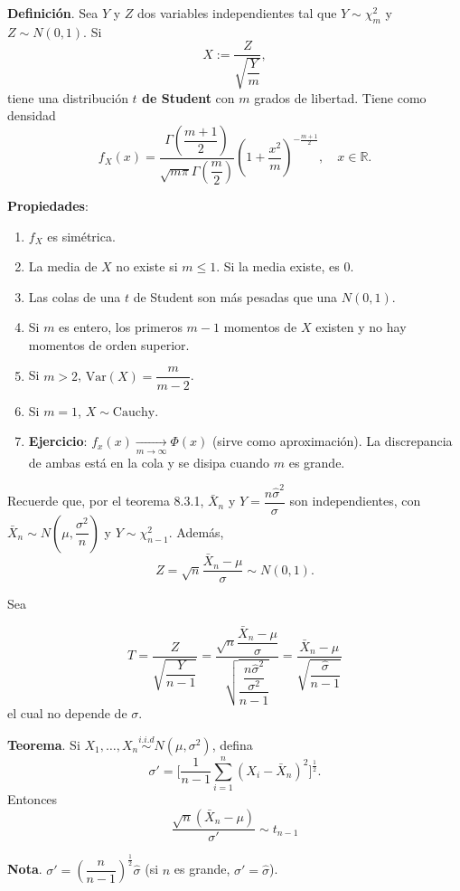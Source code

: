 \documentclass[
  12pt,
]{book}
\begin{document}
\textbf{Definición}. Sea \(Y\) y \(Z\) dos variables independientes tal que \(Y\sim \chi^2_m\) y \(Z\sim N(0,1)\). Si
\[X := \dfrac Z{\sqrt{\dfrac Ym}},\]
tiene una distribución \textbf{\(t\) de Student} con \(m\) grados de libertad. Tiene como densidad
\[f_X(x) = \dfrac{\Gamma\left(\dfrac{m+1}2\right)}{\sqrt{m\pi}\Gamma\left(\dfrac m2 \right)}\left(1+\dfrac{x^2}m\right)^{-\frac{m+1}2}, \quad x\in \mathbb R.\]

\textbf{Propiedades}:

\begin{enumerate}
\def\labelenumi{\arabic{enumi}.}
\item
  \(f_X\) es simétrica.
\item
  La media de \(X\) no existe si \(m\leq 1\). Si la media existe, es 0.
\item
  Las colas de una \(t\) de Student son más pesadas que una \(N(0,1)\).
\item
  Si \(m\) es entero, los primeros \(m-1\) momentos de \(X\) existen y no hay momentos de orden superior.
\item
  Si \(m>2\), \(\text{Var}\left(X \right)=\dfrac m{m-2}\).
\item
  Si \(m=1\), \(X\sim \text{Cauchy}\).
\item
  \textbf{Ejercicio}: \(f_x(x)\xrightarrow[m\to \infty]{}\Phi(x)\) (sirve como aproximación). La discrepancia de ambas está en la cola y se disipa cuando \(m\) es grande.
\end{enumerate}

Recuerde que, por el teorema 8.3.1, \(\bar X_n\) y \(Y=\dfrac{n\hat\sigma^2}{\sigma}\) son independientes, con \(\bar X_n \sim N\left(\mu, \dfrac{\sigma^2}{n}\right)\) y \(Y\sim \chi^2_{n-1}\). Además,
\[Z = \sqrt n\dfrac{\bar X_n-\mu}{\sigma} \sim N(0,1).\]

Sea

\[T = \dfrac Z{\sqrt{\dfrac Y{n-1}}} = \dfrac{\sqrt n \dfrac{\bar X_n-\mu}{\sigma}} {\sqrt{\dfrac{\dfrac{n\hat\sigma^2}{\sigma^2}}{n-1}}} = \dfrac{\bar X_n-\mu}{\sqrt{\dfrac{\hat\sigma}{n-1}}}\]
el cual no depende de \(\sigma\).

\textbf{Teorema}. Si \(X_1,\dots, X_n \stackrel{i.i.d}{\sim} N(\mu,\sigma^2)\), defina
\[\sigma' = \bigg[\dfrac 1{n-1}\sum_{i=1}^n(X_i-\bar X_n)^2\bigg]^\frac 12.\]
Entonces
\[\dfrac{\sqrt{n}(\bar X_n-\mu)}{\sigma'} \sim t_{n-1}\]

\textbf{Nota}. \(\sigma' = \left(\dfrac n{n-1}\right)^\frac 12 \hat\sigma\) (si \(n\) es grande, \(\sigma' = \hat\sigma\)).
\end{document}
